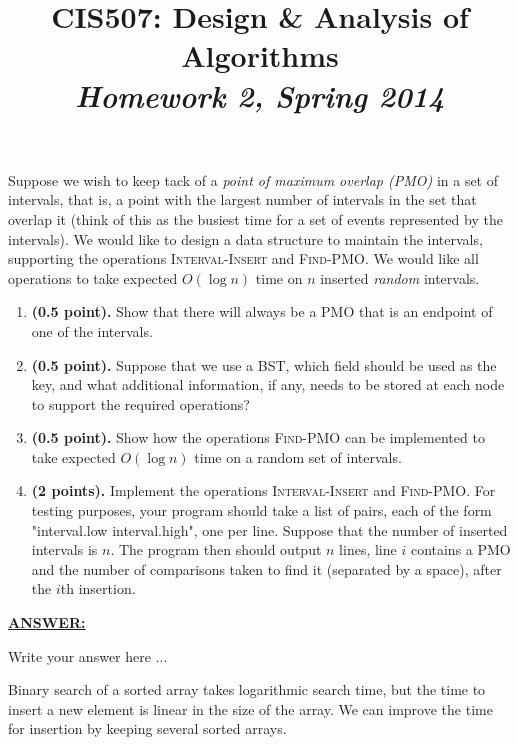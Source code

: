 \documentclass{article}
\begin{document}
\title{CIS507: Design \& Analysis of Algorithms\\\emph{Homework 2, Spring 2014}}


\date{}

\maketitle

 Suppose we wish to keep tack of a {\it point of maximum overlap (PMO)} in a set of intervals, that is, a point with the largest number of intervals in the set that overlap it (think of this as the busiest time for a set of events represented by the intervals). We would like to design a data structure to maintain the intervals, supporting the operations \textsc{Interval-Insert} and \textsc{Find-PMO}. We would like all operations to take expected $O(\log n)$ time on $n$ inserted {\it random} intervals. 
  
\begin{enumerate}
\item  {\bf (0.5 point).} Show that there will always be a PMO that is an endpoint of one of the intervals.  

\item {\bf (0.5 point).} Suppose that we use a BST, which field should be used as the key, and what additional information, if any, needs to be stored at each node to support the required operations? 

\item {\bf (0.5 point).} Show how the operations \textsc{Find-PMO} can be implemented to take expected $O(\log n)$ time on a random set of intervals. 

\item {\bf (2 points).} Implement the operations \textsc{Interval-Insert} and \textsc{Find-PMO}. For testing purposes, your program should take a list of pairs, each of the form "interval.low  interval.high", one per line. Suppose that the number of inserted intervals is $n$. The program then should output $n$ lines, line $i$ contains a PMO and the number of comparisons taken to find it (separated by a space), after the $i$th insertion.  
\end{enumerate}

\noindent \underline{\textbf{ANSWER:}}

Write your answer here ...

\medskip 

Binary search of a sorted array takes logarithmic search time, but the time to insert a new element is linear in the size of the array.  We can improve the time for insertion by keeping several sorted arrays.
\end{document}
